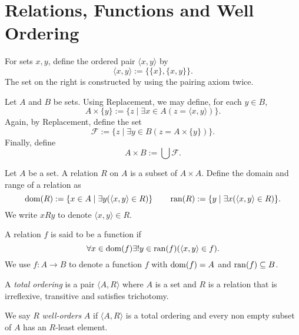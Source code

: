 \section{Relations, Functions and Well Ordering}

\begin{definition}
    For sets $x,y$, define the ordered pair $\langle x,y\rangle$ by 
    \begin{equation*}
        \langle x,y\rangle := \{\{x\}, \{x,y\}\}.
    \end{equation*}
    The set on the right is constructed by using the pairing axiom twice.
\end{definition}

\begin{definition}
    Let $A$ and $B$ be sets. Using Replacement, we may define, for each $y\in B$, 
    \begin{equation*}
        A\times\{y\} := \{z\mid\exists x\in A (z = \langle x,y\rangle)\}.
    \end{equation*}
    Again, by Replacement, define the set 
    \begin{equation*}
        \mathscr F := \{z\mid\exists y\in B(z = A\times\{y\})\}.
    \end{equation*}
    Finally, define 
    \begin{equation*}
        A\times B := \bigcup\mathscr F.
    \end{equation*}
\end{definition}

\begin{definition}
    Let $A$ be a set. A relation $R$ on $A$ is a subset of $A\times A$. Define the domain and range of a relation as 
    \begin{equation*}
        \operatorname{dom}(R) := \{x\in A\mid\exists y(\langle x, y\rangle\in R)\}\qquad\operatorname{ran}(R) := \{y\mid\exists x(\langle x, y\rangle\in R)\}.
    \end{equation*}
    We write $x R y$ to denote $\langle x,y\rangle\in R$.

    A relation $f$ is said to be a function if 
    \begin{equation*}
        \forall x\in\operatorname{dom}(f)\exists! y\in\operatorname{ran}(f)(\langle x,y\rangle\in f).
    \end{equation*}
    We use $f: A\to B$ to denote a function $f$ with $\operatorname{dom}(f) = A$ and $\operatorname{ran}(f)\subseteq B$.
\end{definition}

\begin{definition}
    A \emph{total ordering} is a pair $\langle A, R\rangle$ where $A$ is a set and $R$ is a relation that is irreflexive, transitive and satisfies trichotomy. 

    We say $R$ \emph{well-orders} $A$ if $\langle A,R\rangle$ is a total ordering and every non empty subset of $A$ has an $R$-least element.
\end{definition}


